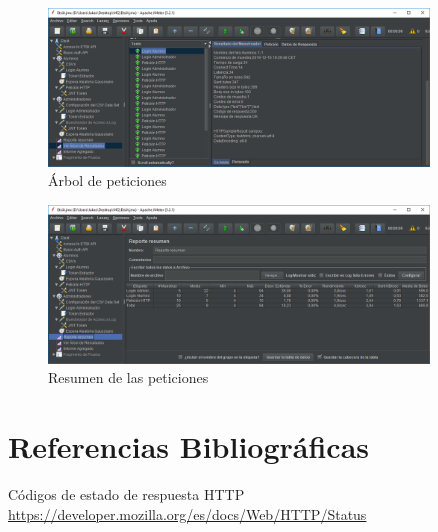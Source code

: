 \documentclass[12pt,a4paper]{article}
\begin{document}
	\begin{figure}[h]
		\centering
		\includegraphics[width=0.9\textwidth]{images/tree-results.png}
		\caption{Árbol de peticiones}
	\end{figure}

	\begin{figure}[h]
		\centering
		\includegraphics[width=0.9\textwidth]{images/summary-report.png}
		\caption{Resumen de las peticiones}
	\end{figure}
	
	\newpage
	\section{Referencias Bibliográficas}
	\begin{thebibliography}{9}
		
		Códigos de estado de respuesta HTTP
		\url{https://developer.mozilla.org/es/docs/Web/HTTP/Status}
		
	\end{thebibliography}
		
\end{document}
